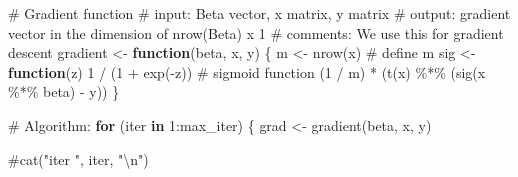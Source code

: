 \documentclass[
  letterpaper,
  DIV=11,
  numbers=noendperiod]{scrartcl}
\newenvironment{Shaded}{\begin{snugshade}}{\end{snugshade}}
\newcommand{\CommentTok}[1]{\textcolor[rgb]{0.37,0.37,0.37}{#1}}
\newcommand{\ControlFlowTok}[1]{\textcolor[rgb]{0.00,0.23,0.31}{\textbf{#1}}}
\newcommand{\DecValTok}[1]{\textcolor[rgb]{0.68,0.00,0.00}{#1}}
\newcommand{\FunctionTok}[1]{\textcolor[rgb]{0.28,0.35,0.67}{#1}}
\newcommand{\NormalTok}[1]{\textcolor[rgb]{0.00,0.23,0.31}{#1}}
\newcommand{\OtherTok}[1]{\textcolor[rgb]{0.00,0.23,0.31}{#1}}
\newcommand{\SpecialCharTok}[1]{\textcolor[rgb]{0.37,0.37,0.37}{#1}}
\begin{document}
\begin{Shaded}
\begin{Highlighting}[]
  \CommentTok{\# Gradient function}
  \CommentTok{\# input: Beta vector, x matrix, y matrix}
  \CommentTok{\# output: gradient vector in the dimension of nrow(Beta) x 1}
  \CommentTok{\# comments: We use this for gradient descent}
\NormalTok{  gradient }\OtherTok{\textless{}{-}} \ControlFlowTok{function}\NormalTok{(beta, x, y) \{}
\NormalTok{    m }\OtherTok{\textless{}{-}} \FunctionTok{nrow}\NormalTok{(x)                       }\CommentTok{\# define m}
\NormalTok{    sig }\OtherTok{\textless{}{-}} \ControlFlowTok{function}\NormalTok{(z) }\DecValTok{1} \SpecialCharTok{/}\NormalTok{ (}\DecValTok{1} \SpecialCharTok{+} \FunctionTok{exp}\NormalTok{(}\SpecialCharTok{{-}}\NormalTok{z))  }\CommentTok{\# sigmoid function}
\NormalTok{    (}\DecValTok{1} \SpecialCharTok{/}\NormalTok{ m) }\SpecialCharTok{*}\NormalTok{ (}\FunctionTok{t}\NormalTok{(x) }\SpecialCharTok{\%*\%}\NormalTok{ (}\FunctionTok{sig}\NormalTok{(x }\SpecialCharTok{\%*\%}\NormalTok{ beta) }\SpecialCharTok{{-}}\NormalTok{ y))}
\NormalTok{  \}}

  \CommentTok{\# Algorithm:}
  \ControlFlowTok{for}\NormalTok{ (iter }\ControlFlowTok{in} \DecValTok{1}\SpecialCharTok{:}\NormalTok{max\_iter) \{}
\NormalTok{    grad }\OtherTok{\textless{}{-}} \FunctionTok{gradient}\NormalTok{(beta, x, y)}
    
    \CommentTok{\#cat("iter ", iter, "\textbackslash{}n")}
    

\end{Highlighting}
\end{Shaded}
\end{document}

